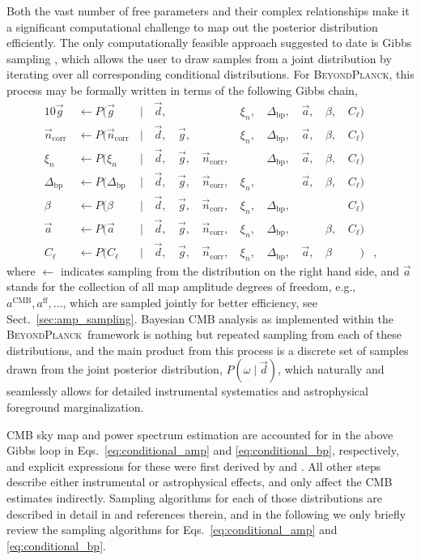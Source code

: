 \documentclass[twocolumn]{aa}
\renewcommand{\d}[0]{\vec{d}}
\newcommand{\n}[0]{\vec{n}}
\newcommand{\red}[0]{\color{red}}
\renewcommand{\a}[0]{\vec{a}}
\newcommand{\g}[0]{\vec{g}}
\newcommand{\BP}{\textsc{BeyondPlanck}}
\newcommand{\Dbp}[0]{\Delta_{\mathrm{bp}}}
\begin{document}
Both the vast number of free parameters and their complex
relationships make it a significant computational challenge to map out
the posterior distribution efficiently. The only computationally
feasible approach suggested to date is Gibbs sampling \citep{geman:1984}, which
allows the user to draw samples from a joint distribution by iterating
over all corresponding conditional distributions. For \BP, this
process may be formally written in terms of the following Gibbs chain,
\begin{alignat}{10}
\g &\,\leftarrow P(\g&\,\mid &\,\d,&\, & &\,\xi_n, &\,\Dbp, &\,\a, &\,\beta, &\,C_{\ell})\label{eq:conditional_gain}\\
\n_{\mathrm{corr}} &\,\leftarrow P(\n_{\mathrm{corr}}&\,\mid &\,\d, &\,\g, &\,&\,\xi_n,
&\,\Dbp, &\,\a, &\,\beta, &\,C_{\ell})\\
\xi_n &\,\leftarrow P(\xi_n&\,\mid &\,\d, &\,\g, &\,\n_{\mathrm{corr}}, &\,
&\,\Dbp, &\,\a, &\,\beta, &\,C_{\ell})\\
\Dbp &\,\leftarrow P(\Dbp&\,\mid &\,\d, &\,\g, &\,\n_{\mathrm{corr}}, &\,\xi_n,
&\,&\,\a, &\,\beta, &\,C_{\ell})\\
\beta &\,\leftarrow P(\beta&\,\mid &\,\d, &\,\g, &\,\n_{\mathrm{corr}}, &\,\xi_n,
&\,\Dbp, & &\,&\,C_{\ell})\label{eq:conditional_beta}\\
\a &\,\leftarrow P(\a&\,\mid &\,\d, &\,\g, &\,\n_{\mathrm{corr}}, &\,\xi_n,
&\,\Dbp, &\,&\,\beta, &\,C_{\ell})\label{eq:conditional_amp}\\
C_{\ell} &\,\leftarrow P(C_{\ell}&\,\mid &\,\d, &\,\g, &\,\n_{\mathrm{corr}}, &\,\xi_n,
	&\,\Dbp, &\,\a, &\,\beta&\,\phantom{C_{\ell}})&,\label{eq:conditional_bp}
\end{alignat}
where $\leftarrow$ indicates sampling from the distribution on the
right hand side, {\red and $\a$ stands for the collection of all map amplitude degrees of freedom, e.g., $a^{\mathrm{CMB}}, a^{\mathrm{ff}},...$, which are sampled jointly for better efficiency, see Sect.~\ref{sec:amp_sampling}}. Bayesian CMB analysis as implemented within the
\BP\ framework is nothing but repeated sampling from each of these
distributions, and the main product from this process is a discrete
set of samples drawn from the joint posterior distribution,
$P(\omega\mid\d)$, which naturally and seamlessly allows for detailed
instrumental systematics and astrophysical foreground
marginalization.

CMB sky map and power spectrum estimation are accounted for in the
above Gibbs loop in Eqs.~\eqref{eq:conditional_amp} and
\eqref{eq:conditional_bp}, respectively, and explicit expressions for
these were first derived by \citet{jewell2004} and
\citet{wandelt2004}. All other steps describe either instrumental or
astrophysical effects, and only affect the CMB estimates indirectly.
Sampling algorithms for each of those distributions are described in
detail in \citet{bp01} and references therein, and in the following we
only briefly review the sampling algorithms for
Eqs.~\eqref{eq:conditional_amp} and \eqref{eq:conditional_bp}.
\end{document}
